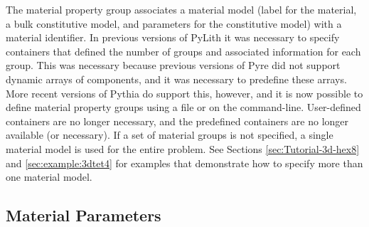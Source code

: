 The material property group associates a material model (label for the
material, a bulk constitutive model, and parameters for the
constitutive model) with a material identifier. In previous versions
of PyLith it was necessary to specify containers that defined the
number of groups and associated information for each group. This was
necessary because previous versions of Pyre did not support dynamic
arrays of components, and it was necessary to predefine these
arrays. More recent versions of Pythia do support this, however, and
it is now possible to define material property groups using a
 file or on the command-line. User-defined containers
are no longer necessary, and the predefined containers are no longer
available (or necessary). If a set of material groups is not
specified, a single material model is used for the entire problem. See
Sections \vref{sec:Tutorial-3d-hex8} and \vref{sec:example:3dtet4}
for examples that demonstrate how to specify more than one material
model.


\subsection{Material Parameters}
\label{sec:material:parameters}

